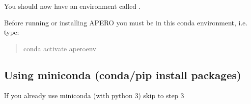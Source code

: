 \documentclass[a4paper,10pt,english]{report}
\begin{document}
You should now have an environment called .

Before running or installing APERO you must be in this conda environment, i.e. type:
\begin{quote}

\begin{sphinxVerbatim}[commandchars=\\\{\}]
conda activate apero\PYGZhy{}env
\end{sphinxVerbatim}
\end{quote}


\subsection{Using miniconda (conda/pip install packages)}
\label{\detokenize{misc/pythoninstallation:using-miniconda-conda-pip-install-packages}}\label{\detokenize{misc/pythoninstallation:python-install-miniconda-manual}}
If you already use miniconda (with python 3) skip to step 3
\end{document}
